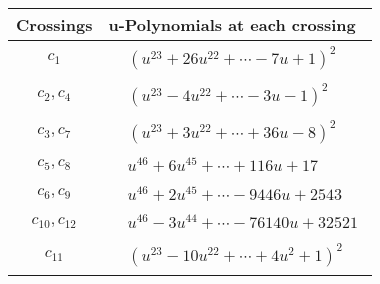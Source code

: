 \documentclass[1p]{elsarticle_modified}
\theoremstyle{definition}
\begin{document}
\begin{tabular}{m{50pt}|m{274pt}}
Crossings & \hspace{64pt}u-Polynomials at each crossing \\
\hline $$\begin{aligned}c_{1}\end{aligned}$$&$\begin{aligned}
&(u^{23}+26 u^{22}+\cdots-7 u+1)^{2}
\end{aligned}$\\
\hline $$\begin{aligned}c_{2},c_{4}\end{aligned}$$&$\begin{aligned}
&(u^{23}-4 u^{22}+\cdots-3 u-1)^{2}
\end{aligned}$\\
\hline $$\begin{aligned}c_{3},c_{7}\end{aligned}$$&$\begin{aligned}
&(u^{23}+3 u^{22}+\cdots+36 u-8)^{2}
\end{aligned}$\\
\hline $$\begin{aligned}c_{5},c_{8}\end{aligned}$$&$\begin{aligned}
&u^{46}+6 u^{45}+\cdots+116 u+17
\end{aligned}$\\
\hline $$\begin{aligned}c_{6},c_{9}\end{aligned}$$&$\begin{aligned}
&u^{46}+2 u^{45}+\cdots-9446 u+2543
\end{aligned}$\\
\hline $$\begin{aligned}c_{10},c_{12}\end{aligned}$$&$\begin{aligned}
&u^{46}-3 u^{44}+\cdots-76140 u+32521
\end{aligned}$\\
\hline $$\begin{aligned}c_{11}\end{aligned}$$&$\begin{aligned}
&(u^{23}-10 u^{22}+\cdots+4 u^2+1)^{2}
\end{aligned}$\\
\hline
\end{tabular}\\~\\
\end{document}
